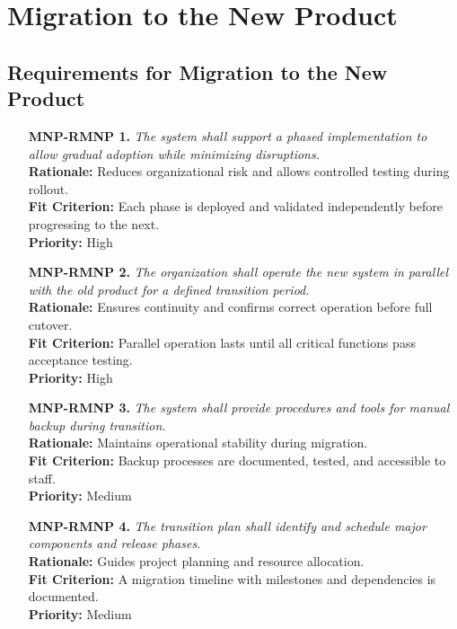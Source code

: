 \documentclass[12pt]{article}
\begin{document}
\section{Migration to the New Product}
\subsection{Requirements for Migration to the New Product}
\begin{itemize}
  \item[\textbf{MNP-RMNP 1.}] \textit{The system shall support a
      phased implementation to allow gradual adoption while minimizing
    disruptions.}\\
    \textbf{Rationale:} Reduces organizational risk and allows
    controlled testing during rollout.\\
    \textbf{Fit Criterion:} Each phase is deployed and validated
    independently before progressing to the next.\\
    \textbf{Priority:} High

  \item[\textbf{MNP-RMNP 2.}] \textit{The organization shall operate
      the new system in parallel with the old product for a defined
    transition period.}\\
    \textbf{Rationale:} Ensures continuity and confirms correct
    operation before full cutover.\\
    \textbf{Fit Criterion:} Parallel operation lasts until all
    critical functions pass acceptance testing.\\
    \textbf{Priority:} High

  \item[\textbf{MNP-RMNP 3.}] \textit{The system shall provide
    procedures and tools for manual backup during transition.}\\
    \textbf{Rationale:} Maintains operational stability during migration.\\
    \textbf{Fit Criterion:} Backup processes are documented, tested,
    and accessible to staff.\\
    \textbf{Priority:} Medium

  \item[\textbf{MNP-RMNP 4.}] \textit{The transition plan shall
    identify and schedule major components and release phases.}\\
    \textbf{Rationale:} Guides project planning and resource allocation.\\
    \textbf{Fit Criterion:} A migration timeline with milestones and
    dependencies is documented.\\
    \textbf{Priority:} Medium
\end{itemize}
\end{document}
